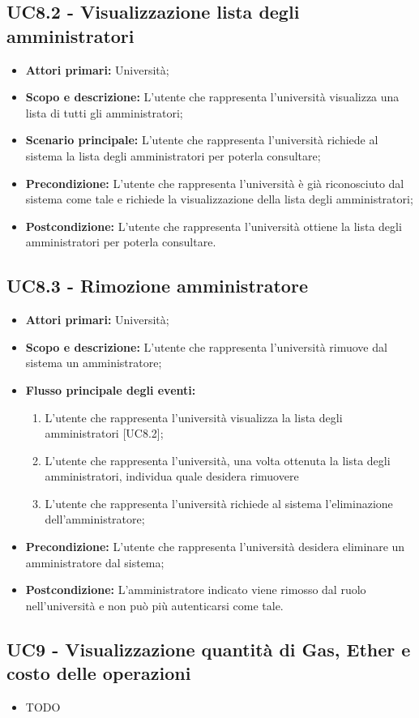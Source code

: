 \documentclass[AnalisiDeiRequisiti.tex]{subfiles}
\begin{document}
\subsection{UC8.2 - Visualizzazione lista degli amministratori}
	\begin{itemize}
	\item \textbf{Attori primari:} Università;\\
	\item \textbf{Scopo e descrizione:} L'utente che rappresenta l'università visualizza una lista di tutti gli amministratori;\\
	\item \textbf{Scenario principale:} L'utente che rappresenta l'università richiede al sistema la lista degli amministratori per poterla consultare;\\
	\item \textbf{Precondizione:} L'utente che rappresenta l'università è già riconosciuto dal sistema come tale e richiede la visualizzazione della lista degli amministratori;\\
	\item \textbf{Postcondizione:} L'utente che rappresenta l'università ottiene la lista degli amministratori per poterla consultare.\\
	\end{itemize}
\subsection{UC8.3 - Rimozione amministratore}
\begin{itemize}
	\item \textbf{Attori primari:} Università;\\
	\item \textbf{Scopo e descrizione:} L'utente che rappresenta l'università rimuove dal sistema un amministratore;\\
	\item \textbf{Flusso principale degli eventi:}\\
	\begin{enumerate}
		\item L'utente che rappresenta l'università  visualizza la lista degli amministratori [UC8.2];
		\item L'utente che rappresenta l'università, una volta ottenuta la lista degli amministratori, individua quale desidera rimuovere\\
		\item L'utente che rappresenta l'università richiede al sistema l'eliminazione dell'amministratore;
	\end{enumerate}
	\item \textbf{Precondizione:} L'utente che rappresenta l'università desidera eliminare un amministratore dal sistema;\\
	\item \textbf{Postcondizione:} L'amministratore indicato viene rimosso dal ruolo nell'università e non può più autenticarsi come tale.\\
\end{itemize}

\subsection{UC9 - Visualizzazione quantità di Gas, Ether e costo delle operazioni}
\begin{itemize}
	\item TODO
\end{itemize}
\end{document}
